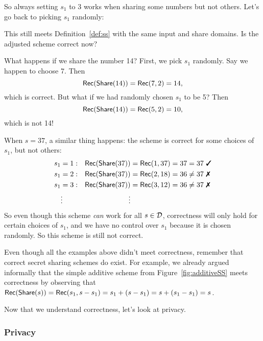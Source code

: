 \begin{example}\label{ex:floor}
    So always setting $s_1$ to 3 works when sharing some numbers but not 
    others. Let's go back to picking $s_1$ randomly:
    \begin{pchstack}[center]
    \pchspace
    \end{pchstack}
    This still meets Definition~\ref{def:ss} with the same input and share 
    domains. Is the adjusted scheme correct now?

    What happens if we share the number 14? First, we pick $s_1$ randomly.
    Say we happen to choose 7. Then 
    \[
        \mathsf{Rec}(\mathsf{Share}(14)) = \mathsf{Rec}(7, 2) = 14,
    \]
    which is correct. But what if we had randomly chosen $s_1$ to be 
    5? Then 
    \[
        \mathsf{Rec}(\mathsf{Share}(14)) = \mathsf{Rec}(5, 2) = 10,
    \]
    which is not 14!

    When $s=37$, a similar thing happens: the scheme is correct for some 
    choices of $s_1$, but not others:
    \begin{align*}
        s_1 &= 1: &\rec(\share(37)) &= \rec(1, 37) = 37 = 37~\text{\cmark}\\
        s_1 &= 2: &\rec(\share(37)) &= \rec(2, 18) = 36 \neq 37~\text{\xmark}\\
        s_1 &= 3: &\rec(\share(37)) &= \rec(3, 12) = 36 \neq 37~\text{\xmark}\\
        &\vdots   &\vdots &
    \end{align*}
    So even though this scheme \emph{can} work for all $s \in \mathcal{D}$, correctness 
    will only hold for certain choices of $s_1$, and we have no control over 
    $s_1$ because it is chosen randomly. So this scheme is still not correct. 
\end{example}

Even though all the examples above didn't meet correctness, remember that
correct secret sharing schemes do exist. For example, we already argued informally that 
the simple additive scheme from Figure~\ref{fig:additiveSS} meets correctness
by observing that $\mathsf{Rec}(\mathsf{Share}(s)) = \mathsf{Rec}(s_1, s-s_1) = s_1 + 
(s-s_1) = s + (s_1-s_1) = s$.

Now that we understand correctness, let's look at privacy.

\subsubsection{Privacy}


